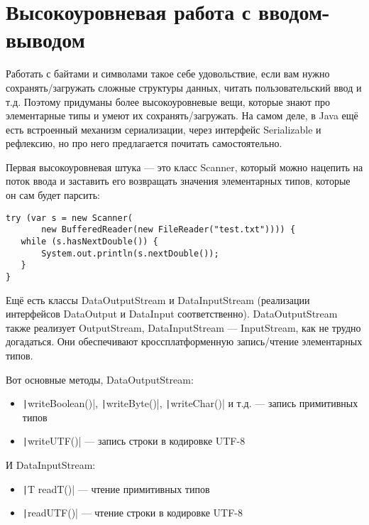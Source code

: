 \documentclass[a5paper]{article}
\begin{document}
\section{Высокоуровневая работа с вводом-выводом}

Работать с байтами и символами такое себе удовольствие, если вам нужно сохранять/загружать сложные структуры данных, читать пользовательский ввод и т.д. Поэтому придуманы более высокоуровневые вещи, которые знают про элементарные типы и умеют их сохранять/загружать. На самом деле, в Java ещё есть встроенный механизм сериализации, через интерфейс Serializable и рефлексию, но про него предлагается почитать самостоятельно.

Первая высокоуровневая штука --- это класс Scanner, который можно нацепить на поток ввода и заставить его возвращать значения элементарных типов, которые он сам будет парсить:

\begin{verbatim}
try (var s = new Scanner(
       new BufferedReader(new FileReader("test.txt")))) {
   while (s.hasNextDouble()) {
       System.out.println(s.nextDouble());
   }
}
\end{verbatim}

Ещё есть классы DataOutputStream и DataInputStream (реализации интерфейсов DataOutput и DataInput соответственно). DataOutputStream также реализует OutputStream, DataInputStream --- InputStream, как не трудно догадаться. Они обеспечивают кроссплатформенную запись/чтение элементарных типов.

Вот основные методы, DataOutputStream:

\begin{itemize}
	\item \texttt|writeBoolean()|, \texttt|writeByte()|, \texttt|writeChar()| и т.д. --- запись примитивных типов
	\item \texttt|writeUTF()| --- запись строки в кодировке UTF-8
\end{itemize}

И DataInputStream:
\begin{itemize}
	\item \texttt|T readT()| --- чтение примитивных типов
	\item \texttt|readUTF()| --- чтение строки в кодировке UTF-8
\end{itemize}
\end{document}
